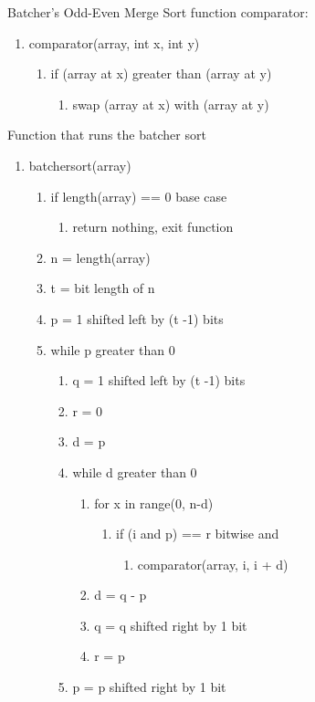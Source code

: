 \documentclass[11pt]{article}
\begin{document}
Batcher's Odd-Even Merge Sort
function comparator:
\begin{enumerate}
\item comparator(array, int x, int y)
	\begin{enumerate}
	\item if (array at x) greater than (array at y)
		\begin{enumerate}
		\item swap (array at x) with (array at y)
		\end{enumerate}
	\end{enumerate}
\end{enumerate}
Function that runs the batcher sort
\begin{enumerate}
\item batchersort(array)
	\begin{enumerate}
	\item if length(array) == 0 base case
		\begin{enumerate}
		\item return nothing, exit function
		\end{enumerate}
	\item n = length(array)
	\item t = bit length of n
	\item p = 1 shifted left by (t -1) bits
	\item while p greater than 0
		\begin{enumerate}
		\item q = 1 shifted left by (t -1) bits
		\item r = 0
		\item d = p
		\item while d greater than 0
			\begin{enumerate}
			\item for x in range(0, n-d)
				\begin{enumerate}
				\item if (i and p) == r  bitwise and
				\begin{enumerate}
				\item comparator(array, i, i + d)
				\end{enumerate}
				\end{enumerate}
			\item d = q - p
			\item q = q shifted right by 1 bit
			\item r = p
			\end{enumerate}
		\item p = p shifted right by 1 bit
		\end{enumerate}
	\end{enumerate}
\end{enumerate}
\end{document}
